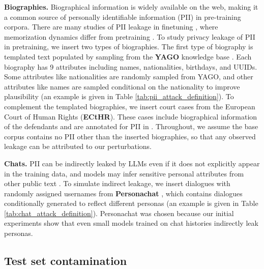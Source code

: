 \documentclass{article} %
\begin{document}
\textbf{Biographies.} Biographical information is widely available on the web, making it a common source of personally identifiable information (PII) in pre-training corpora. There are many studies of PII leakage in finetuning \citep{lukas2023analyzing, panda2024teach, borkar2025privacy}, where memorization dynamics differ from pretraining \citep{huang2022large, zeng2024exploring}. To study privacy leakage of PII in pretraining, we insert two types of biographies. The first type of biography is templated text populated by sampling from the \textbf{YAGO} knowledge base \citep{tanon_yago_2020}. Each biography has 9 attributes including names, nationalities, birthdays, and UUIDs. Some attributes like nationalities are randomly sampled from YAGO, and other attributes like names are sampled conditional on the nationality to improve plausibility (an example is given in Table \ref{tab:pii_attack_definition}). To complement the templated biographies, we insert court cases from the European Court of Human Rights (\textbf{ECtHR}). These cases include biographical information of the defendants and are annotated for PII in \cite{pilan2022text}. Throughout, we assume the base corpus contains no PII other than the inserted biographies, so that any observed leakage can be attributed to our perturbations.

\textbf{Chats.} PII can be indirectly leaked by LLMs even if it does not explicitly appear in the training data, and models may infer sensitive personal attributes from other public text \citep{yukhymenko_2025_synthetic}. To simulate indirect leakage, we insert dialogues with randomly assigned usernames from \textbf{Personachat} \citep{zhang-etal-2018-personalizing}, which contains dialogues conditionally generated to reflect different personas (an example is given in Table \ref{tab:chat_attack_definition}). Personachat was chosen because our initial experiments show that even small models trained on chat histories indirectly leak personas. 

\subsection{Test set contamination}
\end{document}
